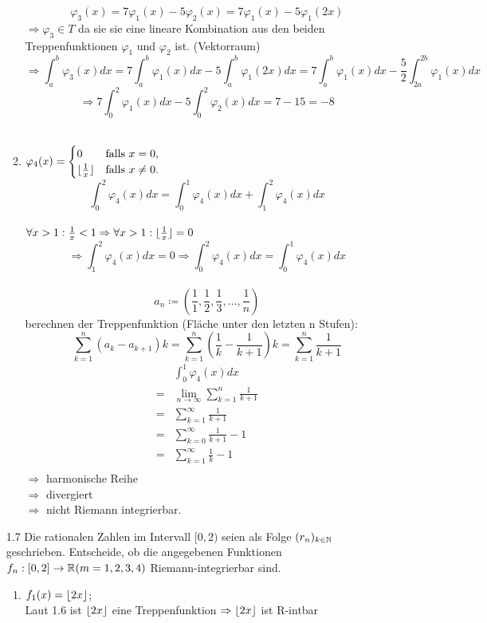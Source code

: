 \documentclass{HM}
\begin{document}
\begin{enumerate}
\begin{enumerate}
				$$\varphi_3(x)=7\varphi_1(x)-5\varphi_2(x)=7\varphi_1(x)-5\varphi_1(2x)$$
				$\Rightarrow \varphi_3\in T$ da sie sie eine lineare Kombination aus den beiden Treppenfunktionen $\varphi_1$ und $\varphi_2$ ist. (Vektorraum)
				$$\Rightarrow \int_a^b\varphi_3(x)dx=
				7\int_a^b\varphi_1(x)dx-5\int_a^b\varphi_1(2x)dx=
				7\int_a^b\varphi_1(x)dx-\frac{5}{2}\int_{2a}^{2b}\varphi_1(x)dx$$
				$$\Rightarrow 7\int_0^2\varphi_1(x)dx-5\int_0^2\varphi_2(x)dx=7-15=-8$$\\
			\item $\varphi_4(x)=\begin{cases}
				0&\text{falls }x=0,\\
				\lfloor\frac{1}{x}\rfloor&\text{falls }x\neq 0.			
			\end{cases}$
			$$\int_0^2\varphi_4(x)dx=\int_0^1\varphi_4(x)dx+\int_1^2\varphi_4(x)dx$$\\
			$\forall x>1:\frac{1}{x}<1\Rightarrow\forall x>1:\lfloor\frac{1}{x}\rfloor=0$
			$$\Rightarrow\int_1^2\varphi_4(x)dx=0\Rightarrow\int_0^2\varphi_4(x)dx=\int_0^1\varphi_4(x)dx$$\\
			$$a_n\coloneqq(\frac{1}{1},\frac{1}{2},\frac{1}{3},\hdots,\frac{1}{n})$$
			berechnen der Treppenfunktion (Fläche unter den letzten n Stufen): $$\sum_{k=1}^n(a_k-a_{k+1})k=\sum_{k=1}^n(\frac{1}{k}-\frac{1}{k+1})k=\sum_{k=1}^n\frac{1}{k+1}$$
			\begin{align*}
				&\int_0^1\varphi_4(x)dx\\
				=&\lim\limits_{n\to\infty}\sum_{k=1}^n\frac{1}{k+1}\\
				=&\sum\limits_{k=1}^\infty\frac{1}{k+1}\\
				=&\sum\limits_{k=0}^\infty\frac{1}{k+1}-1\\
				=&\sum\limits_{k=1}^\infty\frac{1}{k}-1\\
			\end{align*}
			$\Rightarrow$ harmonische Reihe\\
			$\Rightarrow$ divergiert\\
			$\Rightarrow$ nicht Riemann integrierbar.
		\end{enumerate}
		
		\item[1.7] Die rationalen Zahlen im Intervall $[0,2)$ seien als Folge $(r_n)_{k\in\mathbb{N}}$ geschrieben. Entscheide, ob die angegebenen Funktionen $f_n:[0,2]\to\mathbb{R}(m=1,2,3,4)$ Riemann-integrierbar sind.
		\begin{enumerate}
			\item $f_1(x)=\lfloor2x\rfloor$;\\
			Laut 1.6 ist $\lfloor2x\rfloor$ eine Treppenfunktion $\Rightarrow \lfloor2x\rfloor$ ist R-intbar\\
			

\end{enumerate}
\end{enumerate}
\end{document}
